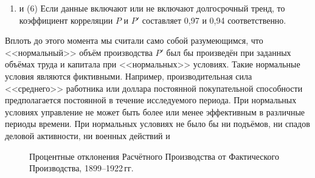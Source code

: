 \documentclass[leqno]{article}  %
\begin{document}
\begin{enumerate}[{(1)}]
\begin{figure}
\caption{Процентное отклонение линий \(P\) и \(P'\) от линий своих трендов
Линия тренда = трёхлетняя скользящая средняя}
\end{figure}
соответственно фазам цикла деловой активности, с той лишь разницей, что амплитуда колебаний \(P'\) (относительно тренда) меньше амплитуды колебаний \(P\) в силу стабилизирующего влияния монотонно возрастающего \(C\).
\par
Если мы также принимаем в расчёт данные Экономических хроник У.\,Л. Торпа, становится очевидным (Таблица VI и Рисунок IV)\footnote{Следует отметить, что алгебраические знаки процентных отклонений в приведённом рисунке противоположны тем, что содержатся в соответствующей таблице.}, что в большинстве случаев результаты наших расчётов имеют свойство быть ниже в периоды подъёма деловой активности и быть выше -- в периоды спада деловой активности. Таким образом не только \(P'\) следует фазам экономического цикла, но и отклонения \(P'\) от \(P\) следуют таким фазам.
\par
\item и (6) Если данные включают или не включают долгосрочный тренд, то коэффициент корреляции \(P\) и \(P'\) составляет 0,97 и 0,94 соответственно.
\end{enumerate}
Вплоть до этого момента мы считали само собой разумеющимся, что <<нормальный>> объём производства \(P'\) был бы произведён при заданных объёмах труда и капитала при <<нормальных>> условиях. Такие нормальные условия являются фиктивными. Например, производительная сила <<среднего>> работника или доллара постоянной покупательной способности предполагается постоянной в течение исследуемого периода. При нормальных условиях управление не может быть более или менее эффективным в различные периоды времени. При нормальных условиях не было бы ни подъёмов, ни спадов деловой активности, ни военных действий и
\begin{figure}
\centering
{}
\caption{Процентные отклонения Расчётного Производства от Фактического Производства, 1899--1922\,гг.}
\end{figure}
\end{document}
